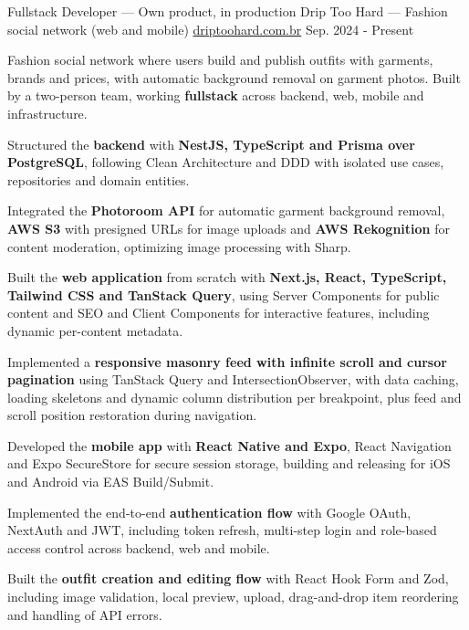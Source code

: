 \begin{cventries}
  \cventry
    {Fullstack Developer --- Own product, in production} %
    {Drip Too Hard --- Fashion social network (web and mobile)} %
    {\href{https://driptoohard.com.br}{driptoohard.com.br}} %
    {Sep. 2024 - Present} %
    {
      \begin{cvitems} %
        \item {Fashion social network where users build and publish outfits with garments, brands and prices, with automatic background removal on garment photos. Built by a two-person team, working \textbf{fullstack} across backend, web, mobile and infrastructure.}
        \item {Structured the \textbf{backend} with \textbf{NestJS, TypeScript and Prisma over PostgreSQL}, following Clean Architecture and DDD with isolated use cases, repositories and domain entities.}
        \item {Integrated the \textbf{Photoroom API} for automatic garment background removal, \textbf{AWS S3} with presigned URLs for image uploads and \textbf{AWS Rekognition} for content moderation, optimizing image processing with Sharp.}
        \item {Built the \textbf{web application} from scratch with \textbf{Next.js, React, TypeScript, Tailwind CSS and TanStack Query}, using Server Components for public content and SEO and Client Components for interactive features, including dynamic per-content metadata.}
        \item {Implemented a \textbf{responsive masonry feed with infinite scroll and cursor pagination} using TanStack Query and IntersectionObserver, with data caching, loading skeletons and dynamic column distribution per breakpoint, plus feed and scroll position restoration during navigation.}
        \item {Developed the \textbf{mobile app} with \textbf{React Native and Expo}, React Navigation and Expo SecureStore for secure session storage, building and releasing for iOS and Android via EAS Build/Submit.}
        \item {Implemented the end-to-end \textbf{authentication flow} with Google OAuth, NextAuth and JWT, including token refresh, multi-step login and role-based access control across backend, web and mobile.}
        \item {Built the \textbf{outfit creation and editing flow} with React Hook Form and Zod, including image validation, local preview, upload, drag-and-drop item reordering and handling of API errors.}

\end{cvitems}}
\end{cventries}

